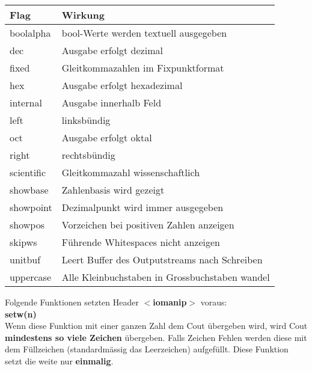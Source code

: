 \begin{center}
    \begin{tabular}{ll}
        \rowcolor[RGB]{239,239,239} 
        \textbf{Flag} & \textbf{Wirkung}                                        \\ \hline
        boolalpha     & bool-Werte werden textuell ausgegeben                   \\
        dec           & Ausgabe erfolgt dezimal                                 \\
        fixed         & Gleitkommazahlen im Fixpunktformat                      \\
        hex           & Ausgabe erfolgt hexadezimal                             \\
        internal      & Ausgabe innerhalb Feld                                  \\
        left          & linksbündig                                             \\
        oct           & Ausgabe erfolgt oktal                                   \\
        right         & rechtsbündig                                            \\
        scientific    & Gleitkommazahl wissenschaftlich                         \\
        showbase      & Zahlenbasis wird gezeigt                                \\
        showpoint     & Dezimalpunkt wird immer ausgegeben                      \\
        showpos       & Vorzeichen bei positiven Zahlen anzeigen                \\
        skipws        & Führende Whitespaces nicht anzeigen                     \\
        unitbuf       & Leert Buffer des Outputstreams nach Schreiben           \\
        uppercase     & Alle Kleinbuchstaben in Grossbuchstaben wandel
    \end{tabular}
\end{center}

Folgende Funktionen setzten Header \textbf{$<$iomanip$>$} voraus:\\

\textbf{setw(n)}\\

Wenn diese Funktion mit einer ganzen Zahl dem Cout übergeben wird, wird Cout \textbf{mindestens so viele Zeichen} übergeben. 
Falls Zeichen Fehlen werden diese mit dem Füllzeichen (standardmässig das Leerzeichen) aufgefüllt. 
Diese Funktion setzt die weite nur \textbf{einmalig}.\\

